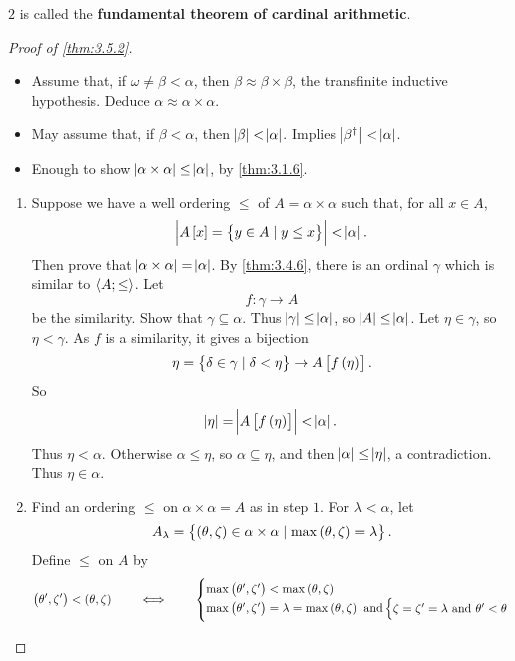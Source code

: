 $ 2 $ is called the \textbf{fundamental theorem of cardinal arithmetic}.


\begin{proof}[Proof of \ref{thm:3.5.2}]
\hfill
\begin{itemize}
\item Assume that, if $ \omega \ne \beta < \alpha $, then $ \beta \approx \beta \times \beta $, the transfinite inductive hypothesis. Deduce $ \alpha \approx \alpha \times \alpha $.
\item May assume that, if $ \beta < \alpha $, then $ \abs{\beta} < \abs{\alpha} $. Implies $ \abs{\beta^\dagger} < \abs{\alpha} $.
\item Enough to show $ \abs{\alpha \times \alpha} \le \abs{\alpha} $, by \ref{thm:3.1.6}.
\end{itemize}
\begin{enumerate}[leftmargin=0.5in, label=Step \arabic*.]
\item Suppose we have a well ordering $ \le $ of $ A = \alpha \times \alpha $ such that, for all $ x \in A $,
$$ \abs{A\sbr{x} = \cbr{y \in A \mid y \le x}} < \abs{\alpha}. $$
Then prove that $ \abs{\alpha \times \alpha} = \abs{\alpha} $. By \ref{thm:3.4.6}, there is an ordinal $ \gamma $ which is similar to $ \abr{A; \le} $. Let
$$ f : \gamma \to A $$
be the similarity. Show that $ \gamma \subseteq \alpha $. Thus $ \abs{\gamma} \le \abs{\alpha} $, so $ \abs{A} \le \abs{\alpha} $. Let $ \eta \in \gamma $, so $ \eta < \gamma $. As $ f $ is a similarity, it gives a bijection
$$ \eta = \cbr{\delta \in \gamma \mid \delta < \eta} \to A\sbr{f\br{\eta}}. $$
So
$$ \abs{\eta} = \abs{A\sbr{f\br{\eta}}} < \abs{\alpha}. $$
Thus $ \eta < \alpha $. Otherwise $ \alpha \le \eta $, so $ \alpha \subseteq \eta $, and then $ \abs{\alpha} \le \abs{\eta} $, a contradiction. Thus $ \eta \in \alpha $.
\item Find an ordering $ \le $ on $ \alpha \times \alpha = A $ as in step $ 1 $. For $ \lambda < \alpha $, let
$$ A_\lambda = \cbr{\br{\theta, \zeta} \in \alpha \times \alpha \mid \max\br{\theta, \zeta} = \lambda}. $$
Define $ \le $ on $ A $ by
$$ \br{\theta', \zeta'} < \br{\theta, \zeta} \qquad \iff \qquad
\begin{cases}
\max\br{\theta', \zeta'} < \max\br{\theta, \zeta} \\
\max\br{\theta', \zeta'} = \lambda = \max\br{\theta, \zeta} \ \text{and}
\begin{cases}
\zeta = \zeta' = \lambda \ \text{and} \ \theta' < \theta \\

\end{cases}
\end{cases}$$
\end{enumerate}
\end{proof}
